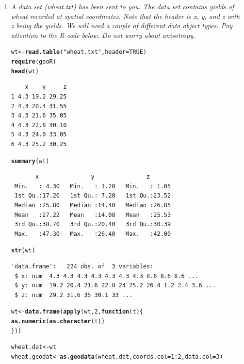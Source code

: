 \documentclass{article}\usepackage[]{graphicx}\usepackage[]{color}
\makeatletter
\newcommand{\hlnum}[1]{\textcolor[rgb]{0.686,0.059,0.569}{#1}}%
\newcommand{\hlstr}[1]{\textcolor[rgb]{0.192,0.494,0.8}{#1}}%
\newcommand{\hlopt}[1]{\textcolor[rgb]{0,0,0}{#1}}%
\newcommand{\hlstd}[1]{\textcolor[rgb]{0.345,0.345,0.345}{#1}}%
\newcommand{\hlkwa}[1]{\textcolor[rgb]{0.161,0.373,0.58}{\textbf{#1}}}%
\newcommand{\hlkwb}[1]{\textcolor[rgb]{0.69,0.353,0.396}{#1}}%
\newcommand{\hlkwc}[1]{\textcolor[rgb]{0.333,0.667,0.333}{#1}}%
\newcommand{\hlkwd}[1]{\textcolor[rgb]{0.737,0.353,0.396}{\textbf{#1}}}%
\newenvironment{kframe}{%
 \def\at@end@of@kframe{}%
 \ifinner\ifhmode%
  \def\at@end@of@kframe{\end{minipage}}%
  \begin{minipage}{\columnwidth}%
 \fi\fi%
 \def\FrameCommand##1{\hskip\@totalleftmargin \hskip-\fboxsep
 \colorbox{shadecolor}{##1}\hskip-\fboxsep
     \hskip-\linewidth \hskip-\@totalleftmargin \hskip\columnwidth}%
 \MakeFramed {\advance\hsize-\width
   \@totalleftmargin\z@ \linewidth\hsize
   \@setminipage}}%
 {\par\unskip\endMakeFramed%
 \at@end@of@kframe}
\newenvironment{knitrout}{}{} %
\makeatother
\begin{document}
\begin{enumerate}
\item %
{\it A data set (wheat.txt) has been sent to you. The data set contains yields of wheat recorded at spatial coordinates. Note that the header is x, y, and z with z being the yields. We will need a couple of different data object types. Pay attention to the R code below. Do not worry about anisotropy.}

\begin{knitrout}\footnotesize
{}\color{fgcolor}\begin{kframe}
\begin{alltt}
\hlstd{wt} \hlkwb{<-} \hlkwd{read.table}\hlstd{(}\hlstr{"wheat.txt"}\hlstd{,} \hlkwc{header} \hlstd{=} \hlnum{TRUE}\hlstd{)}
\hlkwd{require}\hlstd{(geoR)}
\hlkwd{head}\hlstd{(wt)}
\end{alltt}
\begin{verbatim}
    x    y     z
1 4.3 19.2 29.25
2 4.3 20.4 31.55
3 4.3 21.6 35.05
4 4.3 22.8 30.10
5 4.3 24.0 33.05
6 4.3 25.2 30.25
\end{verbatim}
\begin{alltt}
\hlkwd{summary}\hlstd{(wt)}
\end{alltt}
\begin{verbatim}
       x               y               z        
 Min.   : 4.30   Min.   : 1.20   Min.   : 1.05  
 1st Qu.:17.20   1st Qu.: 7.20   1st Qu.:23.52  
 Median :25.80   Median :14.40   Median :26.85  
 Mean   :27.22   Mean   :14.08   Mean   :25.53  
 3rd Qu.:38.70   3rd Qu.:20.40   3rd Qu.:30.39  
 Max.   :47.30   Max.   :26.40   Max.   :42.00  
\end{verbatim}
\begin{alltt}
\hlkwd{str}\hlstd{(wt)}
\end{alltt}
\begin{verbatim}
'data.frame':	224 obs. of  3 variables:
 $ x: num  4.3 4.3 4.3 4.3 4.3 4.3 4.3 8.6 8.6 8.6 ...
 $ y: num  19.2 20.4 21.6 22.8 24 25.2 26.4 1.2 2.4 3.6 ...
 $ z: num  29.2 31.6 35 30.1 33 ...
\end{verbatim}
\begin{alltt}
\hlstd{wt} \hlkwb{<-} \hlkwd{data.frame}\hlstd{(}\hlkwd{apply}\hlstd{(wt,}\hlnum{2}\hlstd{,}\hlkwa{function}\hlstd{(}\hlkwc{t}\hlstd{)\{}
  \hlkwd{as.numeric}\hlstd{(}\hlkwd{as.character}\hlstd{(t))}
\hlstd{\}))}

\hlstd{wheat.dat} \hlkwb{<-} \hlstd{wt}
\hlstd{wheat.geodat} \hlkwb{<-} \hlkwd{as.geodata}\hlstd{(wheat.dat,} \hlkwc{coords.col}\hlstd{=}\hlnum{1}\hlopt{:}\hlnum{2}\hlstd{,}\hlkwc{data.col}\hlstd{=}\hlnum{3}\hlstd{)}


\end{alltt}
\end{kframe}
\end{knitrout}
\end{enumerate}
\end{document}
